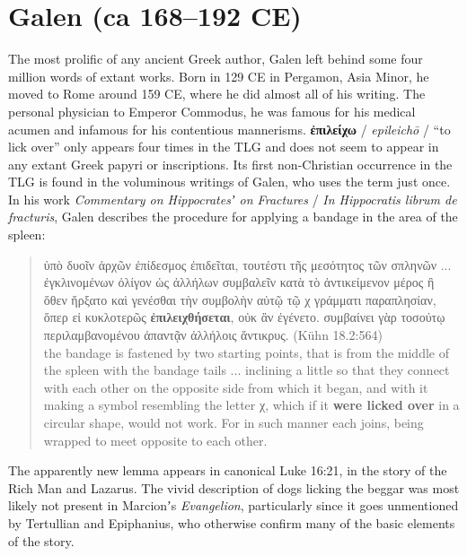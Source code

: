 %
%
\chapter{Galen (ca 168--192 CE)}%
\vspace*{3mm}%
\justifying%
%
\noindent{}The most prolific of any ancient Greek author, %
Galen left behind some four million words of extant works. %
Born in 129 CE in Pergamon, Asia Minor, he moved to Rome around 159 CE, %
where he did almost all of his writing. %
The personal physician to Emperor Commodus, %
he was famous for his medical acumen and infamous for his contentious mannerisms. %
\vfill{}
\noindent{}\textbf{ἐπιλείχω} / \textit{epileichō} / “to lick over” %
only appears four times in the TLG %
and does not seem to appear in any extant Greek papyri or inscriptions. %
Its first non-Christian occurrence in the TLG is found in the voluminous writings of Galen, %
who uses the term just once. %
In his work \textit{Commentary on Hippocratesʼ on Fractures} / \textit{In Hippocratis librum de fracturis}, %
Galen describes the procedure for applying a bandage in the area of the spleen: %
\vfill{}
 \begin{quote}ὑπὸ δυοῖν ἀρχῶν ἐπίδεσμος ἐπιδεῖται, %
 τουτέστι τῆς μεσότητος τῶν σπληνῶν ... %
 ἐγκλινομένων ὀλίγον ὡς ἀλλήλων συμβαλεῖν κατὰ τὸ ἀντικείμενον μέρος %
 ἢ ὅθεν ἤρξατο καὶ γενέσθαι τὴν συμβολὴν αὐτῷ τῷ χ γράμματι παραπλησίαν, %
 ὅπερ εἰ κυκλοτερῶς \textbf{ἐπιλειχθήσεται}, οὐκ ἂν ἐγένετο. %
 συμβαίνει γὰρ τοσούτῳ περιλαμβανομένου ἀπαντᾷν ἀλλήλοις ἄντικρυς. (Kühn 18.2:564) \\[1mm] %
 the bandage is fastened by two starting points, %
 that is from the middle of the spleen with the bandage tails ... %
 inclining a little so that they connect with each other on the opposite side %
 from which it began, and with it making a symbol resembling the letter χ, %
 which if it \textbf{were licked over} in a circular shape, would not work. %
 For in such manner each joins, being wrapped to meet opposite to each other. %
 \end{quote} %
\clearpage

The apparently new lemma appears in canonical Luke 16:21, %
in the story of the Rich Man and Lazarus. %
The vivid description of dogs licking the beggar was most likely not present in Marcionʼs \textit{Evangelion}, %
particularly since it goes unmentioned by Tertullian and Epiphanius, %
who otherwise confirm many of the basic elements of the story. %

